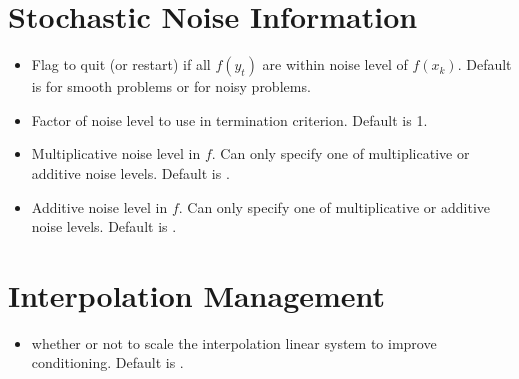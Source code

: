 \documentclass[letterpaper,10pt,english]{sphinxmanual}
\begin{document}
\section{Stochastic Noise Information}
\label{\detokenize{advanced:stochastic-noise-information}}\begin{itemize}
\item {} 
 \sphinxhyphen{} Flag to quit (or restart) if all \(f(y_t)\) are within noise level of \(f(x_k)\). Default is  for smooth problems or  for noisy problems.

\item {} 
 \sphinxhyphen{} Factor of noise level to use in termination criterion. Default is 1.

\item {} 
 \sphinxhyphen{} Multiplicative noise level in \(f\). Can only specify one of multiplicative or additive noise levels. Default is .

\item {} 
 \sphinxhyphen{} Additive noise level in \(f\). Can only specify one of multiplicative or additive noise levels. Default is .

\end{itemize}


\section{Interpolation Management}
\label{\detokenize{advanced:interpolation-management}}\begin{itemize}
\item {} 
 \sphinxhyphen{} whether or not to scale the interpolation linear system to improve conditioning. Default is .

\end{itemize}
\end{document}

